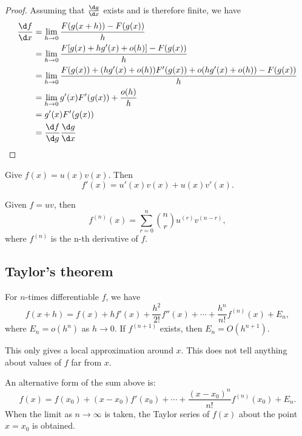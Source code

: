\documentclass[a4paper]{article}
\begin{document}
\begin{proof}
  Assuming that $\frac{\d g}{\d x}$ exists and is therefore finite, we have
  \begin{align*}
    \frac{\d f}{\d x} &= \lim_{h\to 0}\frac{F(g(x + h)) - F(g(x))}{h}\\
    &= \lim_{h\to 0}\frac{F[g(x) + hg'(x) + o(h)] - F(g(x))}{h}\\
    &= \lim_{h\to 0}\frac{F(g(x)) + (hg'(x) + o(h))F'(g(x)) + o(hg'(x) + o(h)) - F(g(x))}{h}\\
    &= \lim_{h\to 0}g'(x)F'(g(x)) + \frac{o(h)}{h}\\
    &= g'(x)F'(g(x))\\
    &= \frac{\d f}{\d g}\frac{\d g}{\d x}
  \end{align*}
\end{proof}

\begin{thm}
  Give $f(x) = u(x)v(x)$. Then 
  \[
  f'(x) = u'(x)v(x) + u(x)v'(x).
  \]
\end{thm}

\begin{thm}
  Given $f = uv$, then 
  \[
  f^{(n)}(x) = \sum_{r = 0}^n {n\choose r}u^{(r)}v^{(n - r)},
  \]
where $f^{(n)}$ is the n-th derivative of $f$.
\end{thm}

\subsection{Taylor's theorem}
\begin{thm}
  For $n$-times differentiable $f$, we have
  \[
  f(x + h) = f(x) + hf'(x) + \frac{h^2}{2!}f''(x) + \cdots + \frac{h^n}{n!}f^{(n)}(x) + E_n,
  \]
  where $E_n = o(h^{n})$ as $h\to 0$. If $f^{(n+1)}$ exists, then $E_n = O(h^{n+1})$.
\end{thm}
\note This only gives a local approximation around $x$. This does not tell anything about values of $f$ far from $x$.

An alternative form of the sum above is:
\[
f(x) = f(x_0) + (x-x_0)f'(x_0) + \cdots + \frac{(x-x_0)^n}{n!}f^{(n)}(x_0) + E_n.
\]
When the limit as $n\to \infty$ is taken, the Taylor series of $f(x)$ about the point $x = x_0$ is obtained.
\end{document}
